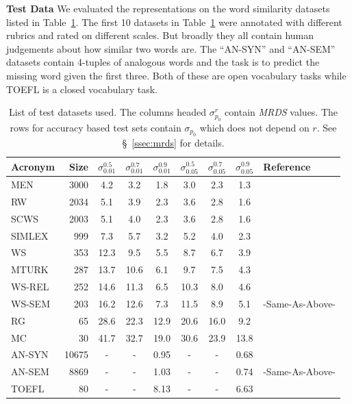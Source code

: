 \documentclass[11pt]{article}
\begin{document}
\noindent\textbf{Test Data} We evaluated the representations on the
word similarity datasets listed in Table~\ref{tab:testlist}. The first
10 datasets in Table~\ref{tab:testlist} were annotated with different
rubrics and rated on different scales. But broadly they all
contain human judgements about how similar two words are.
The ``AN-SYN'' and ``AN-SEM'' datasets contain 4-tuples of
analogous words and the task is to predict the missing word given the
first three. Both of these are  open vocabulary tasks while TOEFL is a closed
vocabulary task. 
\begin{table}[ht]
  \centering
  \begin{tabular}{lr | ccc  | ccc | l}
    Acronym & Size  &
    $\sigma_{0.01}^{0.5}$ & $\sigma_{0.01}^{0.7}$ & $\sigma_{0.01}^{0.9}$ &
    $\sigma_{0.05}^{0.5}$ & $\sigma_{0.05}^{0.7}$ & $\sigma_{0.05}^{0.9}$ &
    Reference  \\ 
    \hline

    MEN    & 3000  & 4.2  & 3.2  & 1.8  & 3.0  & 2.3  & 1.3  & \cite{bruni2012distributional}  \\
    RW     & 2034  & 5.1  & 3.9  & 2.3  & 3.6  & 2.8  & 1.6  & \cite{Luong2013morpho}          \\
    SCWS   & 2003  & 5.1  & 4.0  & 2.3  & 3.6  & 2.8  & 1.6  & \cite{Huang2012Improving}       \\
    SIMLEX & 999   & 7.3  & 5.7  & 3.2  & 5.2  & 4.0  & 2.3  & \cite{hill2014simlex}           \\
    WS     & 353   & 12.3 & 9.5  & 5.5  & 8.7  & 6.7  & 3.9  & \cite{finkelstein2001placing}   \\
    MTURK  & 287   & 13.7 & 10.6 & 6.1  & 9.7  & 7.5  & 4.3  & \cite{Radinsky2011word}         \\
    WS-REL & 252   & 14.6 & 11.3 & 6.5  & 10.3 & 8.0  & 4.6  & \cite{agirre2009study}          \\
    WS-SEM & 203   & 16.2 & 12.6 & 7.3  & 11.5 & 8.9  & 5.1  & -Same-As-Above-                 \\
    RG     & 65    & 28.6 & 22.3 & 12.9 & 20.6 & 16.0 & 9.2  & \cite{Rubenstein1965Contextual} \\
    MC     & 30    & 41.7 & 32.7 & 19.0 & 30.6 & 23.9 & 13.8 & \cite{miller1991contextual}     \\ \hline
    AN-SYN  & 10675 & -    & -    & 0.95 & -    & -    & 0.68 & \cite{mikolov2013distributed}   \\
    AN-SEM  & 8869  & -    & -    & 1.03 & -    & -    & 0.74 & -Same-As-Above-                 \\
    TOEFL  & 80    & -    & -    & 8.13 & -    & -    & 6.63 & \cite{landauer1997solution}
  \end{tabular}
  \caption{List of test datasets used. The columns headed $\sigma_{p_0}^r$ contain 
    \emph{MRDS}
    values. The rows for accuracy based test sets contain
    $\sigma_{p_0}$ which does not depend on $r$. See
    \S~\ref{ssec:mrds} for details.}
   \label{tab:testlist}
\end{table}
\end{document}
